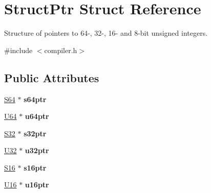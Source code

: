 \hypertarget{struct_struct_ptr}{\section{Struct\-Ptr Struct Reference}
\label{struct_struct_ptr}
}


Structure of pointers to 64-\/, 32-\/, 16-\/ and 8-\/bit unsigned integers.  




{\ttfamily \#include $<$compiler.\-h$>$}

\subsection*{Public Attributes}
\begin{DoxyCompactItemize}
\item 
\hypertarget{struct_struct_ptr_a184a0d1b77988f8b31c1e44640539ae3}{\hyperlink{group__group__xmega__utils_ga1d293e5c494dd6826239b02f5fe98e7f}{S64} $\ast$ {\bfseries s64ptr}}\label{struct_struct_ptr_a184a0d1b77988f8b31c1e44640539ae3}

\item 
\hypertarget{struct_struct_ptr_ad70dd1cc1f7c0862aea54bc6de347534}{\hyperlink{group__group__xmega__utils_ga25809e0734a149248fcf5831efa4e33d}{U64} $\ast$ {\bfseries u64ptr}}\label{struct_struct_ptr_ad70dd1cc1f7c0862aea54bc6de347534}

\item 
\hypertarget{struct_struct_ptr_aa0154c497f6e44b50f2f9d470a19edb7}{\hyperlink{group__group__xmega__utils_ga39c786017723555afb9e8b85accec0de}{S32} $\ast$ {\bfseries s32ptr}}\label{struct_struct_ptr_aa0154c497f6e44b50f2f9d470a19edb7}

\item 
\hypertarget{struct_struct_ptr_a2709554b2f9fcf0bb6f322ca8f6c0e00}{\hyperlink{group__group__xmega__utils_ga696390429f2f3b644bde8d0322a24124}{U32} $\ast$ {\bfseries u32ptr}}\label{struct_struct_ptr_a2709554b2f9fcf0bb6f322ca8f6c0e00}

\item 
\hypertarget{struct_struct_ptr_af27893e4b9420c22e2aaa1d0a1ceb165}{\hyperlink{group__group__xmega__utils_ga6d241ad21a823c90d4835380787db5d4}{S16} $\ast$ {\bfseries s16ptr}}\label{struct_struct_ptr_af27893e4b9420c22e2aaa1d0a1ceb165}

\item 
\hypertarget{struct_struct_ptr_ac3ff20d63a21109b06ddfc5d981d60a4}{\hyperlink{group__group__xmega__utils_ga0a0a322d5fa4a546d293a77ba8b4a71f}{U16} $\ast$ {\bfseries u16ptr}}\label{struct_struct_ptr_ac3ff20d63a21109b06ddfc5d981d60a4}


\end{DoxyCompactItemize}
